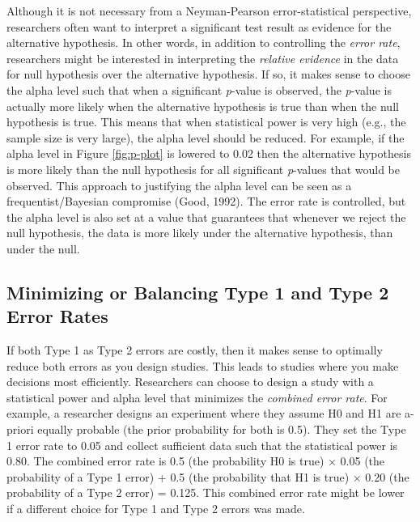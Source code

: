\documentclass[
  english,
  ,jou, a4paper,floatsintext]{apa6}
\begin{document}
Although it is not necessary from a Neyman-Pearson error-statistical perspective, researchers often want to interpret a significant test result as evidence for the alternative hypothesis. In other words, in addition to controlling the \emph{error rate}, researchers might be interested in interpreting the \emph{relative evidence} in the data for null hypothesis over the alternative hypothesis. If so, it makes sense to choose the alpha level such that when a significant \emph{p}-value is observed, the \emph{p}-value is actually more likely when the alternative hypothesis is true than when the null hypothesis is true. This means that when statistical power is very high (e.g., the sample size is very large), the alpha level should be reduced. For example, if the alpha level in Figure \ref{fig:p-plot} is lowered to 0.02 then the alternative hypothesis is more likely than the null hypothesis for all significant \emph{p}-values that would be observed. This approach to justifying the alpha level can be seen as a frequentist/Bayesian compromise (Good, 1992). The error rate is controlled, but the alpha level is also set at a value that guarantees that whenever we reject the null hypothesis, the data is more likely under the alternative hypothesis, than under the null.

\hypertarget{minimizing-or-balancing-type-1-and-type-2-error-rates}{%
\subsection{Minimizing or Balancing Type 1 and Type 2 Error Rates}\label{minimizing-or-balancing-type-1-and-type-2-error-rates}}

If both Type 1 as Type 2 errors are costly, then it makes sense to optimally reduce both errors as you design studies. This leads to studies where you make decisions most efficiently. Researchers can choose to design a study with a statistical power and alpha level that minimizes the \emph{combined error rate}. For example, a researcher designs an experiment where they assume H0 and H1 are a-priori equally probable (the prior probability for both is 0.5). They set the Type 1 error rate to 0.05 and collect sufficient data such that the statistical power is 0.80. The combined error rate is 0.5 (the probability H0 is true) × 0.05 (the probability of a Type 1 error) + 0.5 (the probability that H1 is true) × 0.20 (the probability of a Type 2 error) = 0.125. This combined error rate might be lower if a different choice for Type 1 and Type 2 errors was made.
\end{document}
